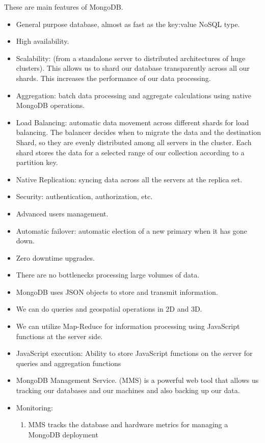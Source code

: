 \documentclass[9pt,twocolumn,twoside]{styles/osajnl}
\begin{document}
These are main features of MongoDB.\cite{www-mongo11}
\begin{itemize}
\item General purpose database, almost as fast as the key:value NoSQL type.

\item High availability.
\item Scalability: (from a standalone server to distributed architectures of huge clusters). This allows us to shard our database transparently across all our shards. This increases the performance of our data processing.
\item Aggregation: batch data processing and aggregate calculations using native MongoDB operations.
\item Load Balancing: automatic data movement across different shards for load balancing. The balancer decides when to migrate the data and the destination Shard, so they are evenly distributed among all servers in the cluster. Each shard stores the data for a selected range of our collection according to a partition key.
\item Native Replication: syncing data across all the servers at the replica set.
\item Security: authentication, authorization, etc.
\item Advanced users management.
\item Automatic failover: automatic election of a new primary when it has gone down.
\item Zero downtime upgrades.
\item There are no bottlenecks processing large volumes of data.
\item MongoDB uses JSON objects to store and transmit information. 
\item We can do queries and geospatial operations in 2D and 3D.
\item We can utilize Map-Reduce for information processing using JavaScript functions at the server side.
\item JavaScript execution: Ability to store JavaScript functions on the server for queries and aggregation functions
\item MongoDB Management Service. (MMS) is a powerful web tool that allows us tracking our databases and our machines and also backing up our data.
\item Monitoring:
\begin{enumerate}
    \item MMS tracks the database and hardware metrics for managing a MongoDB deployment

\end{enumerate}
\end{itemize}
\end{document}
